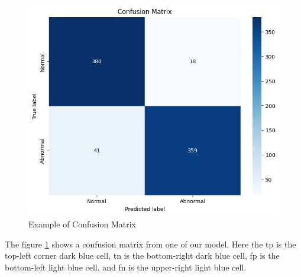 \begin{figure}[ht!]
    \centering
    \includegraphics[width=1\linewidth]{Images/confusion matrix.png}
    \caption{Example of Confusion Matrix}
    \label{fig:confusion matrix}
\end{figure}

The figure \ref{fig:confusion matrix} shows a confusion matrix from one of our model. Here the \gls{tp} is the top-left corner dark blue cell, \gls{tn} is the bottom-right dark blue cell, \gls{fp} is the bottom-left light blue cell, and \gls{fn} is the upper-right light blue cell.


